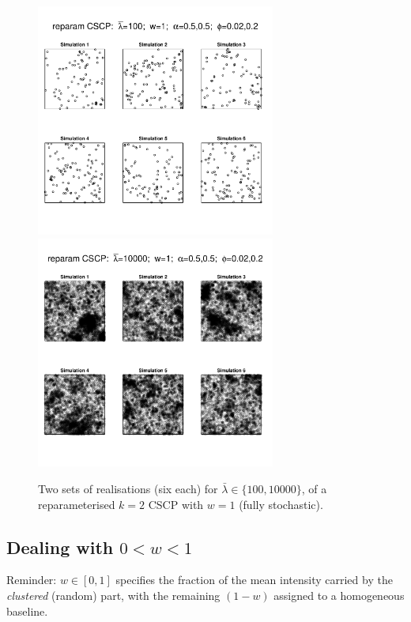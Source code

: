 \documentclass[11pt]{article}
\begin{document}
\begin{figure}
	\includegraphics[width=0.7\textwidth]{fig_repam_w1_100.pdf}\\
	\includegraphics[width=0.7\textwidth]{fig_repam_w1_10000.pdf}\\
	\caption{Two sets of realisations (six each) for $\bar{\lambda}\in\{100,10000\}$, of a reparameterised $k=2$ CSCP with $w=1$ (fully stochastic).}\label{fig:repam}
\end{figure}


\subsection{Dealing with $0<w<1$}

Reminder: $w\in[0,1]$ specifies the fraction of the
mean intensity carried by the \emph{clustered} (random) part, with the remaining
$(1-w)$ assigned to a homogeneous baseline.
\end{document}
